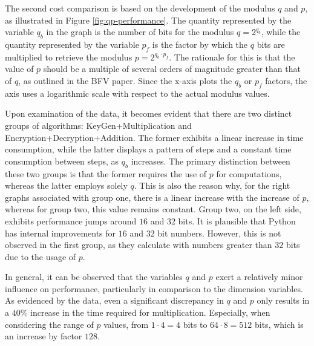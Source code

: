 The second cost comparison is based on the development of the modulus $q$ and $p$, as illustrated in Figure \ref{fig:qp-performance}. 
The quantity represented by the variable $q_b$ in the graph is the number of bits for the modulus $q = 2^{q_b}$, while the quantity represented by the variable $p_f$ is the factor by which the $q$ bits are multiplied to retrieve the modulus $p = 2^{q_b \cdot p_f}$. The rationale for this is that the value of $p$ should be a multiple of several orders of magnitude greater than that of $q$, as outlined in the BFV paper. Since the x-axis plots the $q_b$ or $p_f$ factors, the axis uses a logarithmic scale with respect to the actual modulus values.

Upon examination of the data, it becomes evident that there are two distinct groups of algorithms: KeyGen+Multiplication and Encryption+Decryption+Addition. The former exhibits a linear increase in time consumption, while the latter displays a pattern of steps and a constant time consumption between steps, as $q_b$ increases. The primary distinction between these two groups is that the former requires the use of $p$ for computations, whereas the latter employs solely $q$.  This is also the reason why, for the right graphs associated with group one, there is a linear increase with the increase of $p$, whereas for group two, this value remains constant. Group two, on the left side, exhibits performance jumps around $16$ and $32$ bits. It is plausible that Python has internal improvements for $16$ and $32$ bit numbers. However, this is not observed in the first group, as they calculate with numbers greater than $32$ bits due to the usage of $p$.

In general, it can be observed that the variables $q$ and $p$ exert a relatively minor influence on performance, particularly in comparison to the dimension variables. As evidenced by the data, even a significant discrepancy in $q$ and $p$ only results in a $40\%$ increase in the time required for multiplication. Especially, when considering the range of $p$ values, from $1 \cdot 4=4$ bits to $64 \cdot 8=512$ bits, which is an increase by factor $128$.



